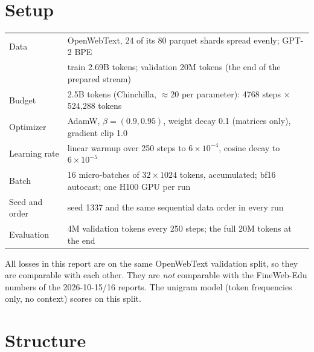 \documentclass[11pt]{article}
\begin{document}
\section{Setup}
\begin{center}\small
\begin{tabularx}{\linewidth}{lX}
\toprule
Data & OpenWebText, 24 of its 80 parquet shards spread evenly; GPT-2 BPE \\
 & train 2.69B tokens; validation 20M tokens (the end of the prepared stream) \\
Budget & 2.5B tokens (Chinchilla, $\approx 20$ per parameter): 4768 steps $\times$ 524{,}288 tokens \\
Optimizer & AdamW, $\beta=(0.9, 0.95)$, weight decay 0.1 (matrices only), gradient clip 1.0 \\
Learning rate & linear warmup over 250 steps to $6\times10^{-4}$, cosine decay to $6\times10^{-5}$ \\
Batch & 16 micro-batches of $32\times1024$ tokens, accumulated; bf16 autocast; one H100 GPU per run \\
Seed and order & seed 1337 and the same sequential data order in every run \\
Evaluation & 4M validation tokens every 250 steps; the full 20M tokens at the end \\
\bottomrule
\end{tabularx}
\end{center}
All losses in this report are on the same OpenWebText validation split, so they are comparable with each
other. They are \emph{not} comparable with the FineWeb-Edu numbers of the 2026-10-15/16 reports. The unigram
model (token frequencies only, no context) scores \Unigram{} on this split.

\section{Structure}
\end{document}
